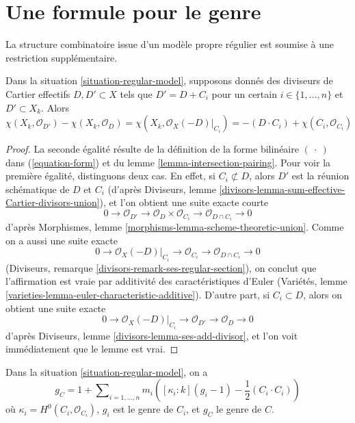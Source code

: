 \section{Une formule pour le genre}
\label{section-genus-formula}

\noindent
La structure combinatoire issue d'un modèle propre régulier
est soumise à une restriction supplémentaire.

\begin{lemma}
\label{lemma-add-component}
Dans la situation \ref{situation-regular-model}, supposons donnés des
diviseurs de Cartier effectifs $D, D' \subset X$ tels que
$D' = D + C_i$ pour un certain $i \in \{1, \ldots, n\}$ et $D' \subset X_k$.
Alors
$$
\chi(X_k, \mathcal{O}_{D'}) - \chi(X_k, \mathcal{O}_D) =
\chi(X_k, \mathcal{O}_X(-D)|_{C_i}) =
-(D \cdot C_i) + \chi(C_i, \mathcal{O}_{C_i})
$$
\end{lemma}

\begin{proof}
La seconde égalité résulte de la définition de la forme bilinéaire
$(\ \cdot\ )$ dans (\ref{equation-form}) et du
lemme \ref{lemma-intersection-pairing}. Pour voir la première
égalité, distinguons deux cas.
En effet, si $C_i \not \subset D$, alors $D'$ est la réunion
schématique de $D$ et $C_i$ (d'après
Diviseurs, lemme \ref{divisors-lemma-sum-effective-Cartier-divisors-union}),
et l'on obtient une suite exacte courte
$$
0 \to \mathcal{O}_{D'} \to
\mathcal{O}_D \times \mathcal{O}_{C_i} \to
\mathcal{O}_{D \cap C_i} \to 0
$$
d'après Morphismes, lemme \ref{morphisms-lemma-scheme-theoretic-union}.
Comme on a aussi une suite exacte
$$
0 \to \mathcal{O}_X(-D)|_{C_i} \to
\mathcal{O}_{C_i} \to \mathcal{O}_{D \cap C_i} \to 0
$$
(Diviseurs, remarque \ref{divisors-remark-ses-regular-section}),
on conclut que l'affirmation est vraie
par additivité des caractéristiques d'Euler
(Variétés, lemme \ref{varieties-lemma-euler-characteristic-additive}).
D'autre part, si $C_i \subset D$, alors on obtient une
suite exacte
$$
0 \to \mathcal{O}_X(-D)|_{C_i} \to \mathcal{O}_{D'} \to \mathcal{O}_D \to 0
$$
d'après Diviseurs, lemme \ref{divisors-lemma-ses-add-divisor},
et l'on voit immédiatement que le lemme est vrai.
\end{proof}

\begin{lemma}
\label{lemma-genus-formula}
Dans la situation \ref{situation-regular-model}, on a
$$
g_C = 1 + \sum\nolimits_{i = 1, \ldots, n}
m_i\left([\kappa_i : k] (g_i - 1) - \frac{1}{2}(C_i \cdot C_i)\right)
$$
où $\kappa_i = H^0(C_i, \mathcal{O}_{C_i})$,
$g_i$ est le genre de $C_i$, et $g_C$ le genre de $C$.
\end{lemma}

